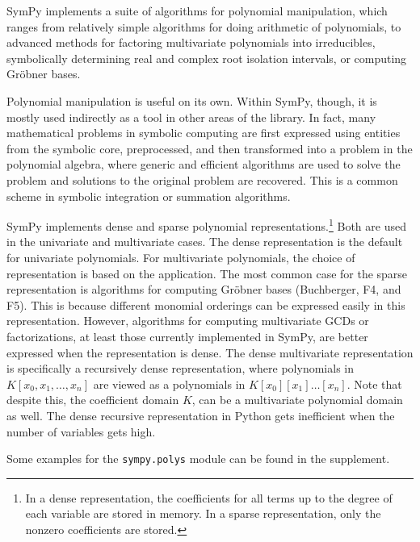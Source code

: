 
SymPy implements a suite of algorithms for polynomial manipulation,
which ranges from relatively simple algorithms for doing arithmetic of
polynomials, to advanced methods for factoring multivariate polynomials
into irreducibles, symbolically determining real and complex root isolation
intervals, or computing Gr\"{o}bner bases.

Polynomial manipulation is useful on its own. Within SymPy, though, it is mostly used
indirectly as a tool in other areas of the library. In fact, many mathematical
problems in symbolic computing are first expressed using entities from the
symbolic core, preprocessed, and then transformed into a problem in the
polynomial algebra, where generic and efficient algorithms are used to solve
the problem and solutions to the original problem are recovered.
This is a common scheme in symbolic integration or summation algorithms.

SymPy implements dense and sparse polynomial representations.\footnote{In a
dense representation, the coefficients for all terms up to the degree of each
variable are stored in memory. In a sparse representation, only the nonzero
coefficients are stored.} Both are used in the univariate and multivariate
cases. The dense representation is the default for univariate polynomials. For
multivariate polynomials, the choice of representation is based on the
application. The most common case for the sparse representation is algorithms
for computing Gr\"{o}bner bases (Buchberger, F4, and F5).
This is
because different monomial orderings can be expressed easily in this
representation. However, algorithms for computing multivariate GCDs or
factorizations, at least those currently implemented in SymPy,
are better expressed when the representation is dense. The dense multivariate
representation is specifically a recursively dense representation, where
polynomials in $K[x_0, x_1, \dotsc, x_n]$ are viewed as a polynomials in
$K[x_0][x_1]\dotso[x_n]$. Note that despite this, the coefficient domain $K$,
can be a multivariate polynomial domain as well. The dense recursive
representation in Python gets inefficient when the number of variables gets
high.

Some examples for the \texttt{sympy.polys} module can be found in the
supplement.
